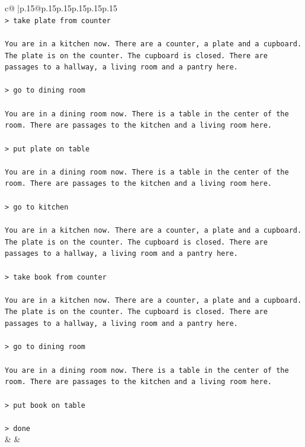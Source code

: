 \documentclass{article}
\begin{document}
{\begin{supertabular}{c@{$\;$}|p{.15\linewidth}@{}p{.15\linewidth}p{.15\linewidth}p{.15\linewidth}p{.15\linewidth}p{.15\linewidth}}
{{{\\ 
\texttt{> take plate from counter} \\
\\ 
\texttt{You are in a kitchen now. There are a counter, a plate and a cupboard. The plate is on the counter. The cupboard is closed. There are passages to a hallway, a living room and a pantry here.} \\
\\ 
\texttt{> go to dining room} \\
\\ 
\texttt{You are in a dining room now. There is a table in the center of the room. There are passages to the kitchen and a living room here.} \\
\\ 
\texttt{> put plate on table} \\
\\ 
\texttt{You are in a dining room now. There is a table in the center of the room. There are passages to the kitchen and a living room here.} \\
\\ 
\texttt{> go to kitchen} \\
\\ 
\texttt{You are in a kitchen now. There are a counter, a plate and a cupboard. The plate is on the counter. The cupboard is closed. There are passages to a hallway, a living room and a pantry here.} \\
\\ 
\texttt{> take book from counter} \\
\\ 
\texttt{You are in a kitchen now. There are a counter, a plate and a cupboard. The plate is on the counter. The cupboard is closed. There are passages to a hallway, a living room and a pantry here.} \\
\\ 
\texttt{> go to dining room} \\
\\ 
\texttt{You are in a dining room now. There is a table in the center of the room. There are passages to the kitchen and a living room here.} \\
\\ 
\texttt{> put book on table} \\
\\ 
\texttt{> done} \\
            }
        }
    }
    & & \\ \\


\end{supertabular}}
\end{document}
